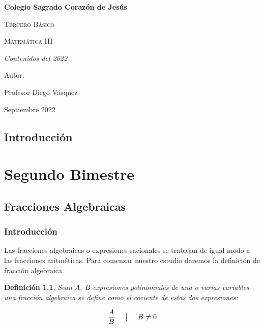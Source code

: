 \documentclass[A4paper, 10pt, oneside]{book}
\newtheorem{definition}{Definición}[chapter]
\begin{document}
	
	\thispagestyle{empty}
	\begin{titlepage}
		\centering
		{\bfseries\LARGE Colegio Sagrado Corazón de Jesús \par}
		\vspace{1cm}
		{\scshape\Large Tercero Básico \par}
		\vspace{3cm}
		{\scshape\Huge Matemática III \par}
		\vspace{3cm}
		{\itshape\Large Contenidos del 2022 \par}
		\vfill
		{\Large Autor: \par}
		{\Large Profesor Diego Vásquez \par}
		\vfill
		{\Large Septiembre 2022 \par}
	\end{titlepage}
	
	\frontmatter
	\tableofcontents
	
	\chapter{Introducción}
	\let\cleardoublepage\clearpage
	
	\mainmatter
	\setcounter{page}{1}
	
	\part{Segundo Bimestre}
	\chapter{Fracciones Algebraicas}
	\section{Introducción}
	Las fracciones algebraicas o expresiones racionales se trabajan de igual modo a las fracciones aritméticas. Para comenzar nuestro estudio daremos la definición de fracción algebraica.
	
	\vspace{5mm}
	
	\begin{definition}
		Sean $A, \ B$ expresiones polinomiales de una o varias variables una fracción algebraica se define como el cociente de estas dos expresiones: 
		
		$$\frac{A}{B} \hspace{5mm} \big| \hspace{5mm}  B\neq 0$$
	\end{definition}
\end{document}

